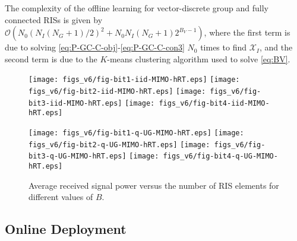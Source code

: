 \documentclass[twocolumn,10pt]{IEEEtran}
\begin{document}
The complexity of the offline learning for vector-discrete group and fully connected RISs is given by $\mathcal{O}(N_0(N_I(N_G+1)/2)^2+N_0N_I(N_G+1)2^{B_V-1})$, where the first term is due to solving \eqref{eq:P-GC-C-obj}-\eqref{eq:P-GC-C-con3} $N_0$ times to find $\mathcal{X}_I$, and the second term is due to the $K$-means clustering algorithm used to solve \eqref{eq:BV}.

\begin{figure*}[t]
    \begin{centering} %
    \texttt{[image: figs\_v6/fig-bit1-iid-MIMO-hRT.eps]}
    \texttt{[image: figs\_v6/fig-bit2-iid-MIMO-hRT.eps]}
    \texttt{[image: figs\_v6/fig-bit3-iid-MIMO-hRT.eps]}
    \texttt{[image: figs\_v6/fig-bit4-iid-MIMO-hRT.eps]}
    \par\end{centering}
    \vspace{0.1cm}
    \begin{centering}
    \texttt{[image: figs\_v6/fig-bit1-q-UG-MIMO-hRT.eps]}
    \texttt{[image: figs\_v6/fig-bit2-q-UG-MIMO-hRT.eps]}
    \texttt{[image: figs\_v6/fig-bit3-q-UG-MIMO-hRT.eps]}
    \texttt{[image: figs\_v6/fig-bit4-q-UG-MIMO-hRT.eps]}
    \par\end{centering}
    \caption{Average received signal power versus the number of RIS elements for different values of $B$.}
    \label{fig:bit}
\end{figure*}

\subsection{Online Deployment}
\end{document}
